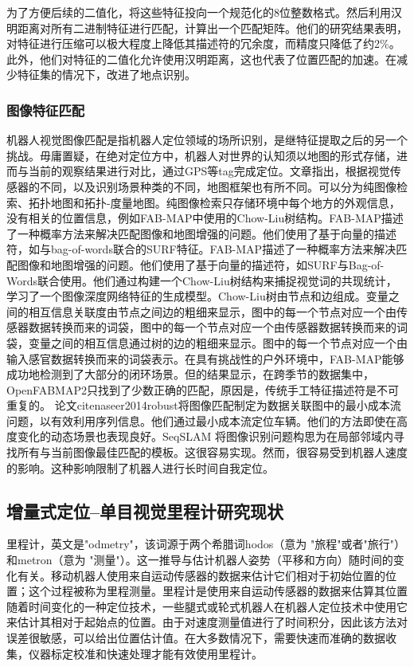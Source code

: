为了方便后续的二值化，\cite{arroyo2016fusion}将这些特征投向一个规范化的8位整数格式。然后利用汉明距离对所有二进制特征进行匹配，计算出一个匹配矩阵。他们的研究结果表明，对特征进行压缩可以极大程度上降低其描述符的冗余度，而精度只降低了约2\%。此外，他们对特征的二值化允许使用汉明距离，这也代表了位置匹配的加速。在减少特征集的情况下，改进了地点识别。

\subsubsection{图像特征匹配}
机器人视觉图像匹配是指机器人定位领域的场所识别，是继特征提取之后的另一个挑战。毋庸置疑，在绝对定位方中，机器人对世界的认知须以地图的形式存储，进而与当前的观察结果进行对比，通过GPS等tag完成定位。文章\cite{lowry2016visual}指出，根据视觉传感器的不同，以及识别场景种类的不同，地图框架也有所不同。可以分为纯图像检索、拓扑地图和拓扑-度量地图。纯图像检索只存储环境中每个地方的外观信息，没有相关的位置信息，例如FAB-MAP中使用的Chow-Liu树结构\cite{cummins2008fab}。FAB-MAP\cite{cummins2008fab}描述了一种概率方法来解决匹配图像和地图增强的问题。他们使用了基于向量的描述符，如与bag-of-words联合的SURF特征。FAB-MAP\cite{cummins2008fab}描述了一种概率方法来解决匹配图像和地图增强的问题。他们使用了基于向量的描述符，如SURF与Bag-of-Words联合使用。他们通过构建一个Chow-Liu树结构\cite{chow1968approximating}来捕捉视觉词的共现统计，学习了一个图像深度网络特征的生成模型。Chow-Liu树由节点和边组成。变量之间的相互信息关联度由节点之间边的粗细来显示，图中的每一个节点对应一个由传感器数据转换而来的词袋，图中的每一个节点对应一个由传感器数据转换而来的词袋，变量之间的相互信息通过树的边的粗细来显示。图中的每一个节点对应一个由输入感官数据转换而来的词袋表示。在具有挑战性的户外环境中，FAB-MAP能够成功地检测到了大部分的闭环场景。但\cite{naseer2014robust}的结果显示，在跨季节的数据集中，OpenFABMAP2只找到了少数正确的匹配，原因是，传统手工特征描述符是不可重复的。 论文cite{naseer2014robust}将图像匹配制定为数据关联图中的最小成本流问题，以有效利用序列信息。他们通过最小成本流定位车辆。他们的方法即使在高度变化的动态场景也表现良好。SeqSLAM \cite{milford2012seqslam}将图像识别问题构思为在局部邻域内寻找所有与当前图像最佳匹配的模板。这很容易实现。然而，\cite{milford2012seqslam}很容易受到机器人速度的影响。这种影响限制了机器人进行长时间自我定位。%


\subsection{增量式定位--单目视觉里程计研究现状}
里程计，英文是"odmetry"，该词源于两个希腊词hodos（意为 "旅程"或者"旅行"）和metron（意为 "测量"）\cite{2005Visual}。这一推导与估计机器人姿势（平移和方向）随时间的变化有关。移动机器人使用来自运动传感器的数据来估计它们相对于初始位置的位置；这个过程被称为里程测量。里程计是使用来自运动传感器的数据来估算其位置随着时间变化的一种定位技术，一些腿式或轮式机器人在机器人定位技术中使用它来估计其相对于起始点的位置。由于对速度测量值进行了时间积分，因此该方法对误差很敏感，可以给出位置估计值。在大多数情况下，需要快速而准确的数据收集，仪器标定校准和快速处理才能有效使用里程计。

